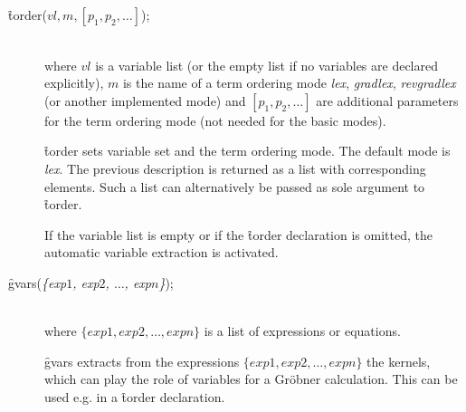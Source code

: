 \begin{description}
\item[{\f{torder}($vl,m,[p_1,p_2,\ldots]$);}]\mbox{}\\
  \hypertarget{operator:TORDER}{}
where $vl$ is a variable list (or the empty list if
no variables are declared explicitly),
$m$ is the name of a term ordering mode \emph{lex}, \emph{gradlex},
\emph{revgradlex} (or another implemented mode) and
$[p_1,p_2,\ldots]$ are additional parameters for the
term ordering mode (not needed for the basic modes).

\f{torder} sets variable set and the term ordering mode.
The default mode is \emph{lex}. The previous description is returned
as a list with corresponding elements. Such a list can
alternatively be passed as sole argument to \f{torder}.

If the variable list is empty or if the \f{torder} declaration
is omitted, the automatic variable extraction is activated.

\item[\f{gvars}(\textit{\{exp$1$, exp$2$, $\ldots$, exp$n$\}});]\mbox{}\\
\hypertarget{operator:GVARS}{}
  where $\{exp1, exp2, \ldots , expn\}$ is a list of expressions or
equations.

\f{gvars} extracts from the expressions $\{exp1, exp2, \ldots , expn\}$
the kernels, which can play the role of variables for a Gr\"obner
calculation. This can be used e.g. in a \f{torder} declaration.
\end{description}

